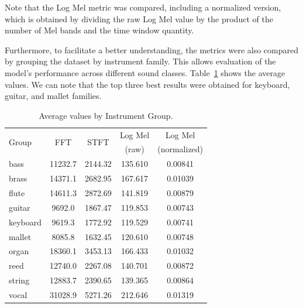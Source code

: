 \documentclass[10pt,conference]{IEEEtran}
\newcommand{\basg}[1]{{\color{blue}[#1]}}
\begin{document}
Note that the Log Mel metric was compared, including a normalized version, which is obtained by dividing the raw Log Mel value by the product of the number of Mel bands and the time window quantity.



Furthermore, to facilitate a better understanding, the metrics were also compared by grouping the dataset by instrument family. This allows evaluation of the model's performance across different sound classes. Table~\ref{tab:avg_metrics_groups} shows the average values.
We can note that the top three best results were obtained for keyboard, guitar, and mallet families.



\begin{table}[htb] \small
  \caption{Average values by Instrument Group.}
  \label{tab:means_by_group_updated}
  \begin{tabular*}{\columnwidth}
	{@{\extracolsep{\fill}}lcccc}
    \toprule
    \multirow{2}{*}{Group} & \multirow{2}{*}{FFT} & \multirow{2}{*}{STFT} & Log Mel& Log Mel \\
    &   &   &   (raw)  & (normalized) \\
    \midrule
    bass     & 11232.7 & 2144.32 & 135.610 & 0.00841 \\
    brass    & 14371.1 & 2682.95 & 167.617 & 0.01039 \\
    flute    & 14611.3 & 2872.69 & 141.819 & 0.00879 \\
    guitar   & 9692.0  & 1867.47 & 119.853 & 0.00743 \\
    keyboard & 9619.3  & 1772.92 & 119.529 & 0.00741 \\
    mallet   & 8085.8  & 1632.45 & 120.610 & 0.00748 \\
    organ    & 18360.1 & 3453.13 & 166.433 & 0.01032 \\
    reed     & 12740.0 & 2267.08 & 140.701 & 0.00872 \\
    string   & 12883.7 & 2390.65 & 139.365 & 0.00864 \\
    vocal    & 31028.9 & 5271.26 & 212.646 & 0.01319 \\
    \bottomrule
  \end{tabular*}
  \label{tab:avg_metrics_groups}
\end{table}
\end{document}
